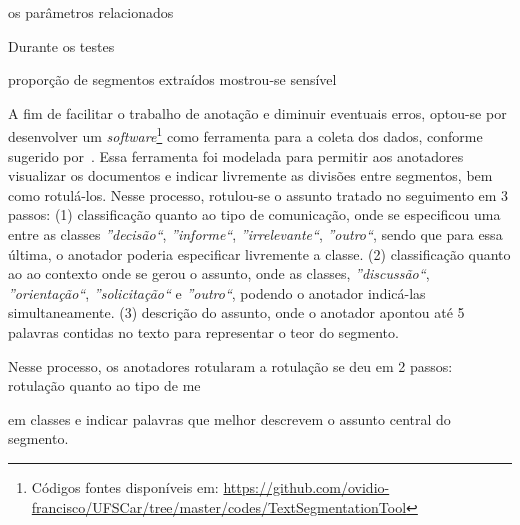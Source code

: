 os parâmetros relacionados 



Durante os testes 



proporção de segmentos extraídos mostrou-se sensível































A fim de facilitar o trabalho de anotação e diminuir eventuais erros, optou-se por desenvolver um \textit{software}\footnote{Códigos fontes disponíveis em: \url{https://github.com/ovidio-francisco/UFSCar/tree/master/codes/TextSegmentationTool} } como ferramenta para a coleta dos dados, conforme sugerido por~\cite{Hovy2010}. Essa ferramenta foi modelada para permitir aos anotadores visualizar os documentos e indicar livremente as divisões entre segmentos, bem como rotulá-los. 
Nesse processo, rotulou-se o assunto tratado no seguimento em 3 passos:
(1) classificação quanto ao tipo de comunicação, onde se especificou uma entre as classes 
\textit{''decisão``},
\textit{''informe``},
\textit{''irrelevante``},
\textit{''outro``}, sendo que para essa última, o anotador poderia especificar livremente a classe.
(2) classificação quanto ao ao contexto onde se gerou o assunto, onde as classes, 
\textit{''discussão``},
\textit{''orientação``},
\textit{''solicitação``} e
\textit{''outro``}, podendo o anotador indicá-las simultaneamente.
(3) descrição do assunto, onde o anotador apontou até 5 palavras contidas no texto para representar o teor do segmento.


Nesse processo, os anotadores rotularam
a rotulação se deu em 2 passos: rotulação quanto ao tipo de me

em classes e indicar palavras que melhor descrevem o assunto central do segmento.





